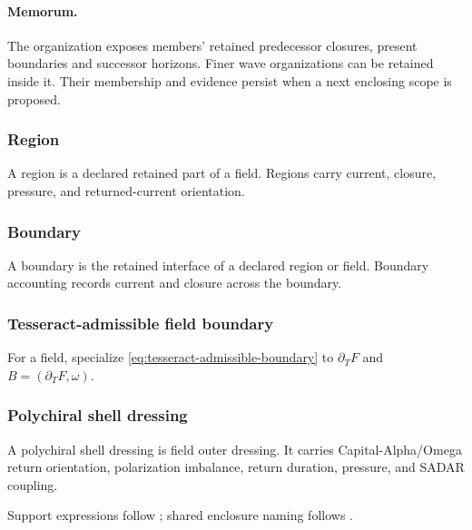 \paragraph{Memorum.}
\label{subsec:field-memorum}
The organization exposes members' retained predecessor closures, present
boundaries and successor horizons. Finer wave organizations can be retained
inside it. Their membership and evidence persist when a next enclosing scope
is proposed.
\subsubsection{Region}
\label{subsec:field-region}
\begin{definition}[Region]
A region is a declared retained part of a field. Regions carry current, closure, pressure, and returned-current orientation.
\end{definition}

\subsubsection{Boundary}
\label{subsec:field-boundary}
\begin{definition}[Boundary]
A boundary is the retained interface of a declared region or field. Boundary accounting records current and closure across the boundary.
\end{definition}

\subsubsection{Tesseract-admissible field boundary}
\label{subsec:tesseract-admissible-boundary}
For a field, specialize \eqref{eq:tesseract-admissible-boundary} to
\(\partial_TF\) and \(B=(\partial_TF,\omega)\).

\subsubsection{Polychiral shell dressing}
\label{subsec:polychiral-shell-dressing}
\begin{definition}
A polychiral shell dressing is field outer dressing. It carries Capital-Alpha/Omega return orientation, polarization imbalance, return duration, pressure, and SADAR coupling.
\end{definition}

Support expressions follow ;
shared enclosure naming follows .

